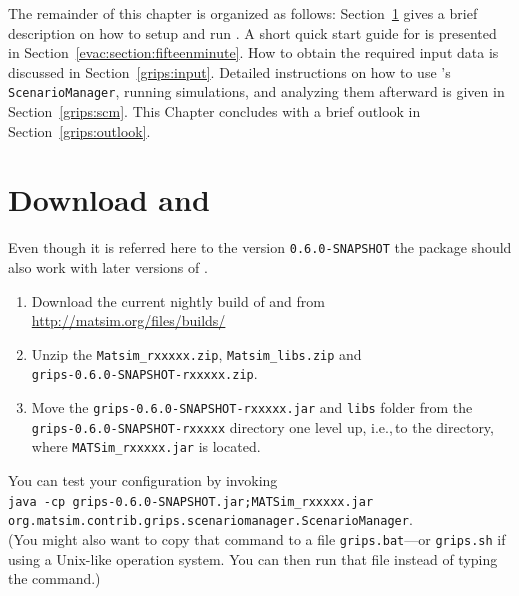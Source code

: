 The remainder of this chapter is organized as follows: Section~\ref{grips:install} gives a brief description on how to setup and run . 
A short quick start guide for  is presented in Section~\ref{evac:section:fifteenminute}. How to obtain the required input data is discussed in Section~\ref{grips:input}. Detailed instructions on how to use 's \lstinline|ScenarioManager|, running simulations, and analyzing them afterward is given in Section~\ref{grips:scm}. This Chapter concludes with a brief outlook in Section~\ref{grips:outlook}.

\section{Download  and }
\label{grips:install}
Even though it is referred here to the  version \lstinline|0.6.0-SNAPSHOT| the package should also work with later versions of .
\begin{enumerate}
\item 
Download the current nightly build of  and  from
\url{http://matsim.org/files/builds/}
\item 
Unzip the \lstinline|Matsim_rxxxxx.zip|, \lstinline|Matsim_libs.zip| and\\
 \lstinline|grips-0.6.0-SNAPSHOT-rxxxxx.zip|.
\item 
Move the \lstinline|grips-0.6.0-SNAPSHOT-rxxxxx.jar| and \lstinline|libs| folder from the \lstinline|grips-0.6.0-SNAPSHOT-rxxxxx| directory one level up, 
i.e.,\,to the directory, where \lstinline|MATSim_rxxxxx.jar| is located.
\end{enumerate}

You can test your configuration by invoking\\ 
\lstinline|java -cp grips-0.6.0-SNAPSHOT.jar;MATSim_rxxxxx.jar|\\ \lstinline|org.matsim.contrib.grips.scenariomanager.ScenarioManager|.\\
(You might also want to copy that command to a file \lstinline|grips.bat|---or \lstinline|grips.sh| if using a Unix-like operation system. You can then run that file instead of typing the command.)

